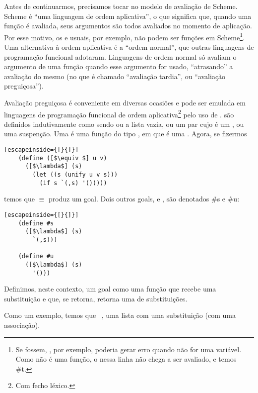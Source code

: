 \documentclass{article}
\begin{document}
  Antes de continuarmos, precisamos tocar no modelo de avaliação de
  Scheme. Scheme é ``uma linguagem de ordem aplicativa'', o que
  significa que, quando uma função é avaliada, seus argumentos são
  todos avaliados no momento de aplicação. Por esse motivo, os
   e  usuais, por exemplo, não podem ser
  funções em Scheme\footnote{Se fossem, , por
    exemplo, poderia gerar erro quando  não for uma
    variável. Como  não é uma função, o 
    nessa linha não chega a ser avaliado, e temos 
    \seta \#t.}. Uma alternativa à ordem aplicativa é a ``ordem
  normal'', que outras linguagens de programação funcional
  adotaram. Linguagens de ordem normal só avaliam o argumento de uma
  função quando esse argumento for usado, ``atrasando'' a avaliação do
  mesmo (no que é chamado ``avaliação tardia'', ou ``avaliação
  preguiçosa'').

  Avaliação preguiçosa é conveniente em diversas ocasiões e pode
  ser emulada em linguagens de programação funcional de ordem
  aplicativa\footnote{Com fecho léxico.} pelo uso de
  .  são definidos indutivamente
  como sendo ou a lista vazia, ou um par cujo
   é um , ou uma suspenção. Uma
   é uma função do tipo , em que  é uma
  . Agora, se fizermos

  \begin{lstlisting}[escapeinside={[}{]}]
    (define ([$\equiv $] u v)
      ([$\lambda$] (s)
        (let ((s (unify u v s)))
          (if s `(,s) '()))))
  \end{lstlisting}
        
  \noindent temos que $\equiv $ produz um goal. Dois outros goals, 
  e , são denotados \#s e \#u:\\

  \begin{lstlisting}[escapeinside={[}{]}]
    (define #s
      ([$\lambda$] (s)
        `(,s)))

    (define #u
      ([$\lambda$] (s)
        '()))
  \end{lstlisting}

  Definimos, neste contexto, um goal como uma função que recebe uma
  substituição e que, se retorna, retorna uma  de
  substituições.

  Como um exemplo, temos que  \seta\
  , uma lista com uma substituição (com uma
  associação).
\end{document}

